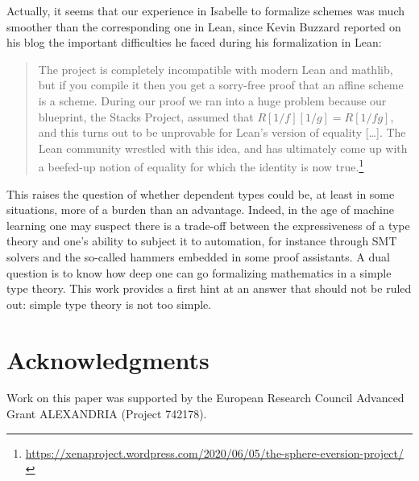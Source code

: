 \documentclass[12pt]{scrartcl}
\begin{document}
Actually, it seems that our experience in Isabelle to formalize schemes was much smoother than the corresponding one in Lean, since Kevin Buzzard reported on his blog the important difficulties he faced during his formalization in Lean:
\begin{quote}
	The project is completely incompatible with modern Lean and mathlib, but if you compile it then you get a sorry-free proof that an affine scheme is a scheme. During our proof we ran into a huge problem because our blueprint, the Stacks Project, assumed that $R[1/f][1/g]=R[1/fg]$, and this turns out to be unprovable for Lean’s version of equality [\dots]. The Lean community wrestled with this idea, and has ultimately come up with a beefed-up notion of equality for which the identity is now true.\footnote{\url{https://xenaproject.wordpress.com/2020/06/05/the-sphere-eversion-project/}}
\end{quote}	
This raises the question of whether dependent types could be, at least in some situations, more of a burden than an advantage. Indeed, in the age of machine learning one may suspect there is a trade-off between the expressiveness of a type theory and one's ability to subject it to automation, for instance through SMT solvers and the so-called hammers embedded in some proof assistants. A dual question is to know how deep one can go formalizing mathematics in a simple type theory. This work provides a first hint at an answer that should not be ruled out: simple type theory is not too simple.       

\section*{Acknowledgments}

Work on this paper was supported by the European Research Council Advanced Grant ALEXANDRIA (Project 742178).  			
\end{document}
